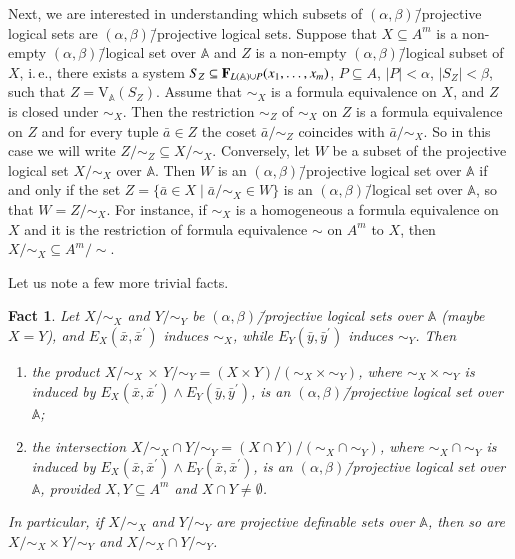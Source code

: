\documentclass[12pt]{article}
\newtheorem{fact}{Fact}
\theoremstyle{definition}
\def\MA{{\mathbb{A}}}
\def\V{{\mathrm{V}}}
\begin{document}
Next, we are interested in understanding which subsets of $(\alpha,\beta)$\=/projective logical sets are $(\alpha,\beta)$\=/projective logical sets. Suppose that $X\subseteq A^m$ is a non-empty $(\alpha,\beta)$\=/logical set over $\MA$ and $Z$ is a non-empty $(\alpha,\beta)$\=/logical subset of $X$, i.\,e., there exists a system $S_Z\subseteq {\bf F}_{L(\MA)\cup P}(x_1,\ldots,x_m)$, $P\subseteq A$, $|P|<\alpha$, $|S_Z|<\beta$, such that $Z=\V_\MA(S_Z)$. Assume that $\sim_X$ is a formula equivalence on $X$, and $Z$ is closed under $\sim_X$. Then the restriction $\sim_Z$ of $\sim_X$ on $Z$ is a formula equivalence on $Z$ and for every tuple $\bar a\in Z$ the coset $\bar a/{\sim_Z}$ coincides with $\bar a/{\sim_X}$. So in this case we will write $Z/{\sim_Z}\subseteq X/{\sim_X}$. Conversely, let $W$ be a subset of the projective logical set $X/{\sim_X}$ over $\MA$. Then $W$ is an $(\alpha,\beta)$\=/projective logical set over $\MA$ if and only if the set $Z=\{\bar a\in X\mid \bar a/{\sim_X}\in W\}$ is an $(\alpha,\beta)$\=/logical set over $\MA$, so that $W=Z/{\sim_X}$. For instance, if $\sim_X$ is a homogeneous a formula equivalence on $X$ and it is the restriction of formula equivalence $\sim$ on $A^m$ to $X$, then $X/{\sim_X}\subseteq A^m/{\sim}$.

Let us note a few more trivial facts.

\begin{fact}\label{fact:times}
Let $X/{\sim_X}$ and $Y/{\sim_Y}$ be $(\alpha,\beta)$\=/projective logical sets over $\MA$ (maybe $X=Y$), and $E_X(\bar x,\bar x^\prime)$ induces $\sim_X$, while $E_Y(\bar y,\bar y^\prime)$ induces $\sim_Y$. Then 
\begin{enumerate}[label=(\alph*)]
   \item the product $X/{\sim_X}\,\times\, Y/{\sim_Y}=(X\times Y)/{({{\sim_X}\times {\sim_Y}})}$, where $\sim_X \times \sim_Y$ is induced by $E_X(\bar x,\bar x^\prime)\wedge E_Y(\bar y, \bar y^\prime)$, is an $(\alpha,\beta)$\=/projective logical set over $\MA$;  
  \item the intersection $X/{\sim_X}\cap Y/{\sim_Y}=(X\cap Y)/{(\sim_X\cap \sim_Y)}$, where $\sim_X\cap \sim_Y$ is induced by $E_X(\bar x,\bar x^\prime)\wedge E_Y(\bar x, \bar x^\prime)$, is an $(\alpha,\beta)$\=/projective logical set over $\MA$, provided $X,Y\subseteq A^m$ and $X\cap Y\ne \emptyset$.
\end{enumerate}
In particular, if $X/{\sim_X}$ and $Y/{\sim_Y}$ are projective definable sets over $\MA$, then so are $X/{\sim_X}\times Y/{\sim_Y}$ and $X/{\sim_X}\cap Y/{\sim_Y}$.
\end{fact}
\end{document}
